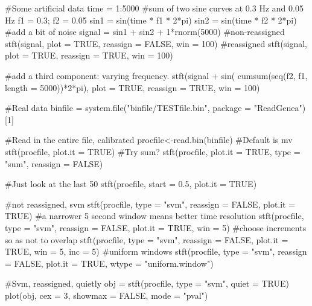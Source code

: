 \documentclass[a4paper]{book}
\begin{document}
\begin{Examples}
\begin{ExampleCode}
#Some artificial data
time = 1:5000
#sum of two sine curves at 0.3 Hz and 0.05 Hz
f1 = 0.3; f2 = 0.05
sin1 = sin(time * f1 * 2*pi)
sin2 = sin(time * f2 * 2*pi)
#add a bit of noise
signal = sin1 + sin2 + 1*rnorm(5000)
#non-reassigned
stft(signal, plot = TRUE, reassign = FALSE, win = 100)
#reassigned
stft(signal, plot = TRUE, reassign = TRUE, win = 100)

#add a third component: varying frequency.
stft(signal + sin( cumsum(seq(f2, f1, length = 5000))*2*pi), plot = TRUE, reassign = TRUE, win = 100)

#Real data
binfile  = system.file("binfile/TESTfile.bin", package = "ReadGenea")[1]

#Read in the entire file, calibrated
procfile<-read.bin(binfile)
#Default is mv
stft(procfile, plot.it = TRUE)
#Try sum?
stft(procfile, plot.it = TRUE, type = "sum", reassign = FALSE)

#Just look at the last 50%
stft(procfile, start = 0.5, plot.it = TRUE)

#not reassigned, svm
stft(procfile, type = "svm", reassign = FALSE, plot.it = TRUE)
#a narrower 5 second window means better time resolution
stft(procfile, type = "svm", reassign = FALSE, plot.it = TRUE, win = 5)
#choose increments so as not to overlap
stft(procfile, type = "svm", reassign = FALSE, plot.it = TRUE, win = 5, inc = 5)
#uniform windows
stft(procfile, type = "svm", reassign = FALSE, plot.it = TRUE, wtype = "uniform.window")

#Svm, reassigned, quietly
obj = stft(procfile, type = "svm", quiet = TRUE)
plot(obj, cex = 3, showmax = FALSE, mode = "pval")
\end{ExampleCode}
\end{Examples}
\printindex{}
\end{document}
